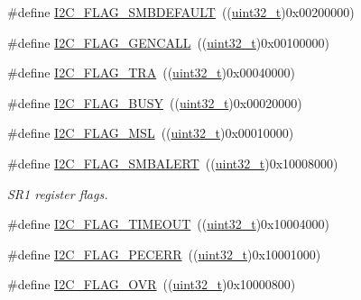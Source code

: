 \begin{DoxyCompactItemize}
\item 
\#define \hyperlink{group___i2_c__flags__definition_ga371fb29861d1cd41736253e804c67ad5}{I2\+C\+\_\+\+F\+L\+A\+G\+\_\+\+S\+M\+B\+D\+E\+F\+A\+U\+LT}~((\hyperlink{_p_e___types_8h_a33594304e786b158f3fb30289278f5af}{uint32\+\_\+t})0x00200000)
\item 
\#define \hyperlink{group___i2_c__flags__definition_gab3a93b6840ad406c2fc09e0e96c59b88}{I2\+C\+\_\+\+F\+L\+A\+G\+\_\+\+G\+E\+N\+C\+A\+LL}~((\hyperlink{_p_e___types_8h_a33594304e786b158f3fb30289278f5af}{uint32\+\_\+t})0x00100000)
\item 
\#define \hyperlink{group___i2_c__flags__definition_ga0359a5f960670d51cb17e659d32498ea}{I2\+C\+\_\+\+F\+L\+A\+G\+\_\+\+T\+RA}~((\hyperlink{_p_e___types_8h_a33594304e786b158f3fb30289278f5af}{uint32\+\_\+t})0x00040000)
\item 
\#define \hyperlink{group___i2_c__flags__definition_ga50f69f043d99600221076100823b6ff3}{I2\+C\+\_\+\+F\+L\+A\+G\+\_\+\+B\+U\+SY}~((\hyperlink{_p_e___types_8h_a33594304e786b158f3fb30289278f5af}{uint32\+\_\+t})0x00020000)
\item 
\#define \hyperlink{group___i2_c__flags__definition_gae8e6a404cbfd70420d278d520304f368}{I2\+C\+\_\+\+F\+L\+A\+G\+\_\+\+M\+SL}~((\hyperlink{_p_e___types_8h_a33594304e786b158f3fb30289278f5af}{uint32\+\_\+t})0x00010000)
\item 
\#define \hyperlink{group___i2_c__flags__definition_ga4e1d7cd1574d03ba501c27483300c1be}{I2\+C\+\_\+\+F\+L\+A\+G\+\_\+\+S\+M\+B\+A\+L\+E\+RT}~((\hyperlink{_p_e___types_8h_a33594304e786b158f3fb30289278f5af}{uint32\+\_\+t})0x10008000)
\begin{DoxyCompactList}\small\item\em S\+R1 register flags. \end{DoxyCompactList}\item 
\#define \hyperlink{group___i2_c__flags__definition_ga89c8d5d8ccc77a8619fafe9b39d1cc74}{I2\+C\+\_\+\+F\+L\+A\+G\+\_\+\+T\+I\+M\+E\+O\+UT}~((\hyperlink{_p_e___types_8h_a33594304e786b158f3fb30289278f5af}{uint32\+\_\+t})0x10004000)
\item 
\#define \hyperlink{group___i2_c__flags__definition_ga6c7addb6413f165f42bcc87506ea8467}{I2\+C\+\_\+\+F\+L\+A\+G\+\_\+\+P\+E\+C\+E\+RR}~((\hyperlink{_p_e___types_8h_a33594304e786b158f3fb30289278f5af}{uint32\+\_\+t})0x10001000)
\item 
\#define \hyperlink{group___i2_c__flags__definition_gab579673c8ac920db199aa7f18e547fb3}{I2\+C\+\_\+\+F\+L\+A\+G\+\_\+\+O\+VR}~((\hyperlink{_p_e___types_8h_a33594304e786b158f3fb30289278f5af}{uint32\+\_\+t})0x10000800)

\end{DoxyCompactItemize}
